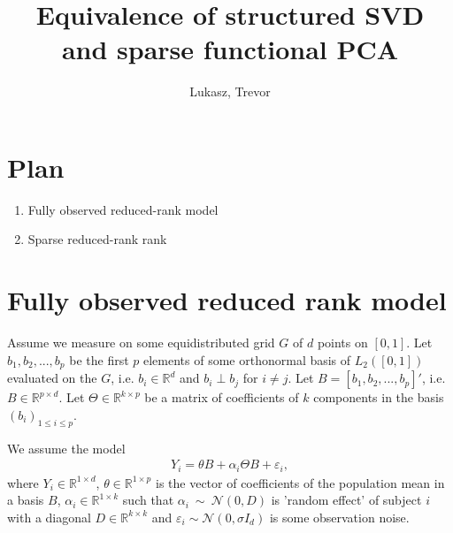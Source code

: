 \documentclass{article}
\title{Equivalence of structured SVD\\ and sparse functional PCA}
\author{Lukasz, Trevor}
\newcommand{\cN}{\mathcal{N}}
\newcommand{\R}{\mathbb{R}}
\begin{document}
\maketitle

\section*{Plan}

\begin{enumerate}
  \item Fully observed reduced-rank model
  \item Sparse reduced-rank rank
\end{enumerate}

\section{Fully observed reduced rank model}
Assume we measure on some equidistributed grid $G$ of $d$ points on $[0,1]$. Let $b_1, b_2, ..., b_p$ be the first $p$ elements of some orthonormal basis of $L_2([0,1])$ evaluated on the $G$, i.e. $b_i \in \R^d$ and $b_i \perp b_j$ for $i \neq j$. Let $B = [b_1,b_2,...,b_p]'$, i.e. $B \in \R^{p \times d}$. Let $\Theta \in \R^{k \times p}$ be a matrix of coefficients of $k$ components in the basis $(b_i)_{1 \leq i \leq p}$.

We assume the model
\begin{align}\label{eq:model}
Y_i = \theta B + \alpha_i \Theta B + \varepsilon_i,
\end{align}
where $Y_i \in \R^{1 \times d}$, $\theta \in \R^{1 \times p}$ is the vector of coefficients of the population mean in a basis $B$, $\alpha_i \in \R^{1 \times k}$ such that $\alpha_i~\sim~\cN(0, D)$ is 'random effect' of subject $i$ with a diagonal $D \in \R^{k \times k}$ and $\varepsilon_i \sim \cN(0, \sigma I_d)$ is some observation noise.
\end{document}
